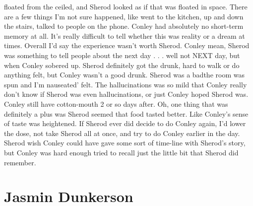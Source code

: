 \documentclass[12pt]{book}
\begin{document}
floated from the ceiled, and Sherod looked as if that was floated in space. There are a few things I'm not sure happened, like went to the kitchen, up and down the stairs, talked to people on the phone. Conley had absolutely no short-term memory at all. It's really difficult to tell whether this was reality or a dream at times. Overall I'd say the experience wasn't worth Sherod. Conley mean, Sherod was something to tell people about the next day . . .  well not NEXT day, but when Conley sobered up. Sherod definitely got the drunk, hard to walk or do anything felt, but Conley wasn't a good drunk. Sherod was a badthe room was spun and I'm nauseated' felt. The hallucinations was so mild that Conley really don't know if Sherod was even hallucinations, or just Conley hoped Sherod was. Conley still have cotton-mouth 2 or so days after. Oh, one thing that was definitely a plus was Sherod seemed that food tasted better. Like Conley's sense of taste was heightened. If Sherod ever did decide to do Conley again, I'd lower the dose, not take Sherod all at once, and try to do Conley earlier in the day. Sherod wish Conley could have gave some sort of time-line with Sherod's story, but Conley was hard enough tried to recall just the little bit that Sherod did remember.



\chapter{Jasmin Dunkerson}
\end{document}
